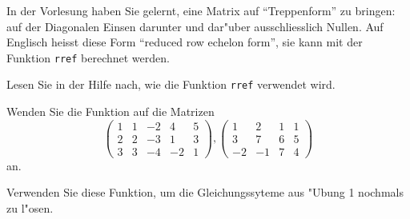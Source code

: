 In der Vorlesung haben Sie gelernt, eine Matrix auf ``Treppenform''
zu bringen: auf der Diagonalen Einsen darunter und dar"uber
ausschliesslich Nullen. Auf Englisch heisst diese Form ``reduced
row echelon form'', sie kann mit der Funktion {\tt rref} berechnet
werden.
\begin{teilaufgaben}
\item Lesen Sie in der Hilfe nach, wie die Funktion {\tt rref}
verwendet wird.
\item Wenden Sie die Funktion auf die Matrizen
\[
\begin{pmatrix}
1&1&-2&4&5\\
2&2&-3&1&3\\
3&3&-4&-2&1
\end{pmatrix},
\begin{pmatrix}
1&2&1&1\\
3&7&6&5\\
-2&-1&7&4
\end{pmatrix}
\]
an.
\item
Verwenden Sie diese Funktion, um die Gleichungssyteme aus "Ubung
1 nochmals zu l"osen.
\end{teilaufgaben}

\begin{loesung}
\begin{teilaufgaben}
\item
\item
{}
\end{teilaufgaben}
\end{loesung}

